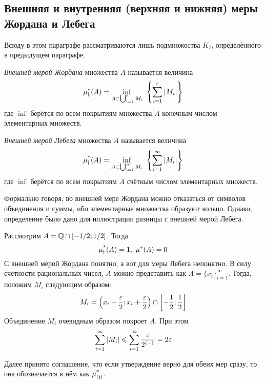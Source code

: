 \subsection{Внешняя и внутренняя (верхняя и нижняя) меры Жордана и Лебега}

\begin{note}
	Всюду в этом параграфе рассматриваются лишь подмножества $K_I$, определённого в предыдущем параграфе.
\end{note}

\begin{definition}
	\textit{Внешней мерой Жордана} множества $A$ называется величина
	\[
		\mu^*_\mathfrak{j}(A) = \inf_{A \subset \bigcup_{i = 1}^r M_i} \ \left\{\sum\limits_{i = 1}^r |M_i|\right\}
	\]
	где $\inf$ берётся по всем покрытиям множества $A$ конечным числом элементарных множеств.
\end{definition}

\begin{definition}
	\textit{Внешней мерой Лебега} множества $A$ называется величина
	\[
		\operatorname{\mu^*_\mathfrak{j}}(A) = \inf_{A \subset \bigcup_{i = 1}^\infty M_i} \ \left\{\sum\limits_{i = 1}^\infty |M_i|\right\}
	\]
	где $\inf$ берётся по всем покрытиям $A$ счётным числом элементарных множеств.
\end{definition}

\begin{note}
	Формально говоря, во внешней мере Жордана можно отказаться от символов объединения и суммы, ибо элементарные множества образуют кольцо. Однако, определение было дано для иллюстрации разницы с внешней мерой Лебега.
\end{note}

\begin{example}
	Рассмотрим $A = \mathbb{Q} \cap [-1/2; 1/2]$. Тогда
	\[
		\operatorname{\mu^*_\mathfrak{j}}(A) = 1,\ \mu^*(A) = 0
	\]
	С внешней мерой Жордана понятно, а вот для меры Лебега непонятно. В силу счётности рациональных чисел, $A$ можно представить как $A = \{x_i\}_{i = 1}^\infty$. Тогда, положим $M_i$ следующим образом:
	\[
		M_i = \left(x_i - \frac{\varepsilon}{2}; x_i + \frac{\varepsilon}{2}\right) \cap \left[-\frac{1}{2}; \frac{1}{2}\right]
	\]
	Объединение $M_i$ очевидным образом покроет $A$. При этом
	\[
		\sum\limits_{i = 1}^\infty |M_i| \leqslant \sum\limits_{i = 1}^\infty \frac{\varepsilon}{2^{i - 1}} = 2\varepsilon
	\]
\end{example}

\begin{note}
	Далее принято соглашение, что если утверждение верно для обеих мер сразу, то она обозначается в нём как $\operatorname{\mu^*_{(\mathfrak{j})}}$.
\end{note}

